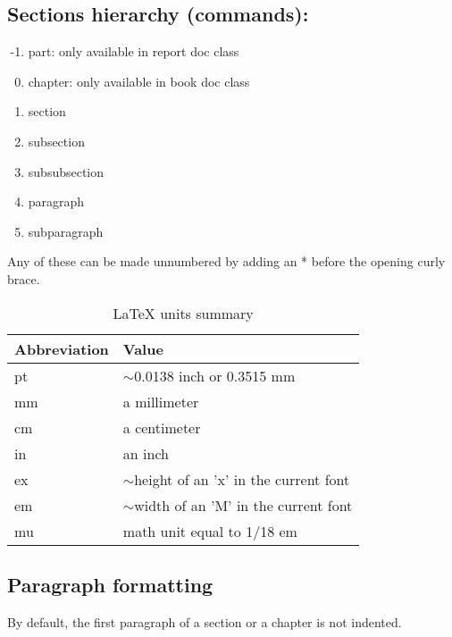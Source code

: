 \documentclass[12pt, letterpaper]{article} %
\begin{document}
\clearpage
\subsection*{Sections hierarchy (commands):} %

\begin{enumerate}
	\setcounter{enumi}{-2} %
	\item part: only available in report doc class
	\item chapter: only available in book doc class
	\item section
	\item subsection
	\item subsubsection
	\item paragraph
	\item subparagraph
\end{enumerate}
Any of these can be made unnumbered by adding an * before the opening curly 
brace.

\begin{table}[!h] %
	\centering
	\begin{tabular}{|l|l|}
		\hline
		Abbreviation & Value                                      \\ \hline
		pt           & $\sim$0.0138 inch or 0.3515 mm             \\ \hline
		mm           & a millimeter                               \\ \hline
		cm           & a centimeter                               \\ \hline
		in           & an inch                                    \\ \hline
		ex           & $\sim$height of an 'x' in the current font \\ \hline
		em           & $\sim$width of an 'M' in the current font  \\ \hline
		mu           & math unit equal to 1/18 em                 \\ \hline
	\end{tabular}
	\caption{LaTeX units summary}
	\label{table:units}
\end{table}

\subsection*{Paragraph formatting}

By default, the first paragraph of a section or a chapter is not indented.
\end{document}
